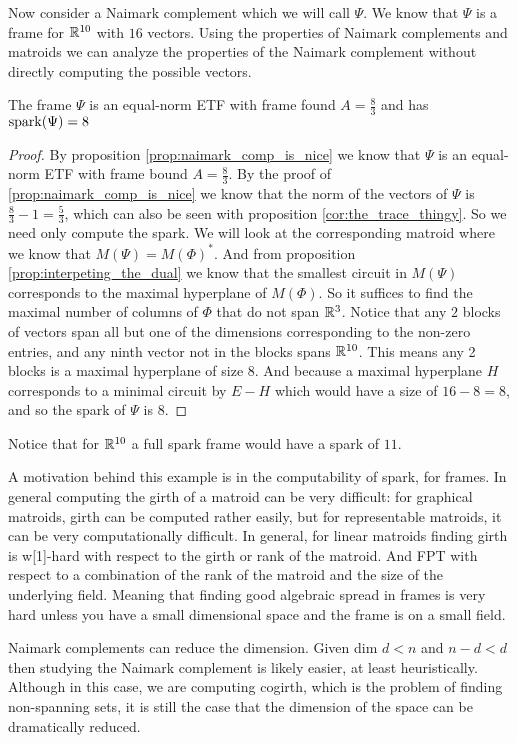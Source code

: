 Now consider a Naimark complement which we will call $\Psi$. We know that $\Psi$ is a frame for $\mathbb{R}^{10}$ with $16$ vectors. Using the properties of Naimark complements and matroids we can analyze the properties of the Naimark complement without directly computing the possible vectors.

\begin{example}
    The frame $\Psi$ is an equal-norm ETF with frame found $A=\frac{8}{3}$ and has $\operatorname{\mathrm{spark}}(\Psi)=8$
\end{example}
\begin{proof}
    By proposition \ref{prop:naimark_comp_is_nice} we know that $\Psi$ is an equal-norm ETF with frame bound $A=\frac{8}{3}$. By the proof of \ref{prop:naimark_comp_is_nice} we know that the norm of the vectors of $\Psi$ is $\frac{8}{3}-1=\frac{5}{3}$, which can also be seen with proposition \ref{cor:the_trace_thingy}. So we need only compute the spark. We will look at the corresponding matroid where we know that $M(\Psi)=M(\Phi)^*$. And from proposition \ref{prop:interpeting_the_dual} we know that the smallest circuit in $M(\Psi)$ corresponds to the maximal hyperplane of $M(\Phi)$. So it suffices to find the maximal number of columns of $\Phi$ that do not span $\mathbb{R}^3$. Notice that any $2$ blocks of vectors span all but one of the dimensions corresponding to the non-zero entries, and any ninth vector not in the blocks spans $\mathbb{R}^{10}$. This means any 2 blocks is a maximal hyperplane of size $8$. And because a maximal hyperplane $H$ corresponds to a minimal circuit by $E-H$ which would have a size of $16-8=8$, and so the spark of $\Psi$ is $8$.
\end{proof}

 Notice that for $\mathbb{R}^{10}$ a full spark frame would have a spark of $11$.

A motivation behind this example is in the computability of spark, for frames. In general computing the girth of a matroid can be very difficult: for graphical matroids, girth can be computed rather easily, but for representable matroids, it can be very computationally difficult.
In general, for linear matroids finding girth is w[1]-hard with respect to the girth or rank of the matroid. And FPT with respect to a combination of the rank of the matroid and the size of the underlying field. Meaning that finding good algebraic spread in frames is very hard unless you have a small dimensional space and the frame is on a small field.

Naimark complements can reduce the dimension. Given dim $d<n$ and $n-d<d$ then studying the Naimark complement is likely easier, at least heuristically. Although in this case, we are computing cogirth, which is the problem of finding non-spanning sets, it is still the case that the dimension of the space can be dramatically reduced.